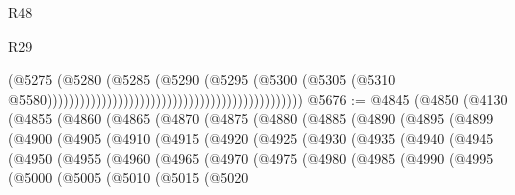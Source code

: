 \begin{lexlean}{R48}
\begin{lexlean}{R29}
\begin{coremodule}
{{{{{{{{{{{{{{{{{{{{{{{{{{{{{{{{{{{{{{{{{{{{{{{{{{{{{{{{{{{{{{{{{{{{{{{{{{{{{{{{{{{{{{{{{{{{{{{{{{{{{{{{{{{{{{{{{{{{{{{{{{{{{{{{{{{{{{{{{{{{{{{{{{{{{{{{{{{{{{{{{{{{{{{{{{{{{{{{{{{{{{{{{{{{{{{{{{{{{{{{{{{{{{{{{{{{{{{{{{                                                                                  (@5275
                                                                                    (@5280
                                                                                      (@5285
                                                                                        (@5290
                                                                                          (@5295
                                                                                            (@5300
                                                                                              (@5305
                                                                                                (@5310
                                                                                                  @5580)))))))))))))))))))))))))))))))))))))))))))))))
@5676 := @4845
    (@4850
      (@4130
        (@4855
          (@4860
            (@4865
              (@4870
                (@4875
                  (@4880
                    (@4885
                      (@4890
                        (@4895
                          (@4899
                            (@4900
                              (@4905
                                (@4910
                                  (@4915
                                    (@4920
                                      (@4925
                                        (@4930
                                          (@4935
                                            (@4940
                                              (@4945
                                                (@4950
                                                  (@4955
                                                    (@4960
                                                      (@4965
                                                        (@4970
                                                          (@4975
                                                            (@4980
                                                              (@4985
                                                                (@4990
                                                                  (@4995
                                                                    (@5000
                                                                      (@5005
                                                                        (@5010
                                                                          (@5015
                                                                            (@5020
}}}}}}}}}}}}}}}}}}}}}}}}}}}}}}}}}}}}}}}}}}}}}}}}}}}}}}}}}}}}}}}}}}}}}}}}}}}}}}}}}}}}}}}}}}}}}}}}}}}}}}}}}}}}}}}}}}}}}}}}}}}}}}}}}}}}}}}}}}}}}}}}}}}}}}}}}}}}}}}}}}}}}}}}}}}}}}}}}}}}}}}}}}}}}}}}}}}}}}}}}}}}}}}}}}}}}}}}}}
\end{coremodule}
\end{lexlean}
\end{lexlean}
